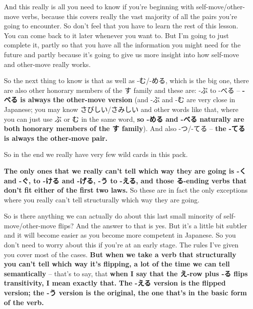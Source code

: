 \thinrule

And this really is all you need to know if you're beginning with self-move/other-move verbs, because this covers really the vast majority of all the pairs you're going to encounter. So don't feel that you have to learn the rest of this lesson. You can come back to it later whenever you want to. But I'm going to just complete it, partly so that you have all the information you might need for the future and partly because it's going to give us more insight into how self-move and other-move really works.

\stopsectionlevel

\startsectionlevel[title={Honorary Rules},reference={honorary-rules}]

So the next thing to know is that as well as -む/-める, which is the big one, there are also other honorary members of the す family and these are: -ぶ to -べる -- {\bf -べる is always the other-move version} (and -ぶ and -む are very close in Japanese; you may know さびしい/さみしい and other words like that, where you can just use ぶ or む in the same word, {\bf so -める and -べる naturally are both honorary members of the す family}). And also -つ/-てる -- {\bf the -てる is always the other-move pair.}

So in the end we really have very few wild cards in this pack.

{}

{\bf The only ones that we really can't tell which way they are going is -く and -ぐ, to -ける and -げる, -う to -える, and those る-ending verbs that don't fit either of the first two laws.} So these are in fact the only exceptions where you really can't tell structurally which way they are going.

{}

So is there anything we can actually do about this last small minority of self-move/other-move flips? And the answer to that is yes. But it's a little bit subtler and it will become easier as you become more competent in Japanese. So you don't need to worry about this if you're at an early stage. The rules I've given you cover most of the cases. {\bf But when we take a verb that structurally you can't tell which way it's flipping, a lot of the time we can tell semantically} -- that's to say, that {\bf when I say that the え-row plus -る flips transitivity, I mean exactly that.} {\bf The -える version is the flipped version; the -う version is the original, the one that's in the basic form of the verb.}

